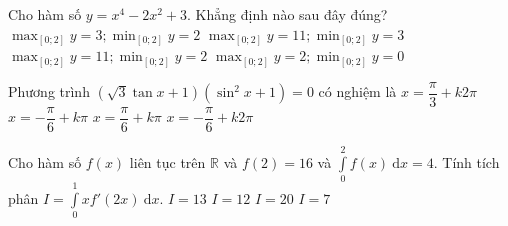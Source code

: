 \begin{ex}%
Cho hàm số $y=x^4-2x^2+3$. Khẳng định nào sau đây đúng?
\choice
{$\displaystyle \max_{[0;2]} y =3 ; \min_{[0;2]} y = 2$}
{$\displaystyle \max_{[0;2]} y =11 ; \min_{[0;2]} y = 3$}
{\True $\displaystyle \max_{[0;2]} y =11 ; \min_{[0;2]} y = 2$}
{$\displaystyle \max_{[0;2]} y =2 ; \min_{[0;2]} y = 0$}
\end{ex}

\begin{ex}%
Phương trình $\left ( \sqrt{3}\tan x +1\right )\left (\sin^2x+1\right ) =0$ có nghiệm là
\choice
{$x= \dfrac{\pi}{3} +k2\pi$}
{\True $x= -\dfrac{\pi}{6} +k\pi$}
{$x= \dfrac{\pi}{6} +k\pi$}
{$x= -\dfrac{\pi}{6} +k2\pi$}
\end{ex}

\begin{ex}%
Cho hàm số $f(x)$ liên tục trên $\mathbb{R}$ và $f(2) =16$ và $\displaystyle \int\limits_{0}^{2} f(x)~\mathrm{d}x =4$. Tính tích phân $I=\displaystyle \int\limits_{0}^{1} xf'(2x) ~\mathrm{d}x$. 
\choice
{$I=13$}
{$I=12$}
{$I=20$}
{\True $I=7$}
\end{ex}

